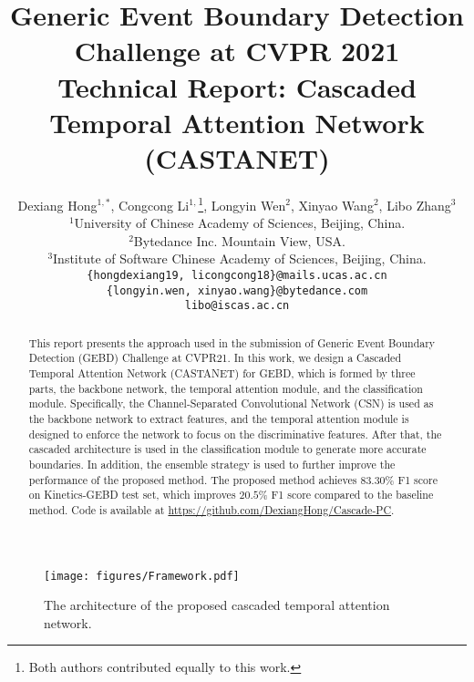\documentclass[final]{cvpr}
\begin{document}
\title{Generic Event Boundary Detection Challenge at CVPR 2021 \\
Technical Report: Cascaded Temporal Attention Network (CASTANET)
}

\author{Dexiang Hong$^{1,\ast}$, Congcong Li$^{1,}$\thanks{Both authors contributed equally to this work.}, Longyin Wen$^2$, Xinyao Wang$^2$, Libo Zhang$^3$ \\
$^1$University of Chinese Academy of Sciences, Beijing, China.\\
$^2$Bytedance Inc. Mountain View, USA.\\
$^3$Institute of Software Chinese Academy of Sciences, Beijing, China.\\
{\tt\small \{hongdexiang19, licongcong18\}@mails.ucas.ac.cn} \\
{\tt\small \{longyin.wen, xinyao.wang\}@bytedance.com} \\
{\tt\small libo@iscas.ac.cn}
}

\maketitle

\begin{abstract}
This report presents the approach used in the submission of Generic Event Boundary Detection (GEBD) Challenge at CVPR21. In this work, we design a Cascaded Temporal Attention Network (CASTANET) for GEBD, which is formed by three parts, the backbone network, the temporal attention module, and the classification module. Specifically, the Channel-Separated Convolutional Network (CSN) is used as the backbone network to extract features, and the temporal attention module is designed to enforce the network to focus on the discriminative features. After that, the cascaded architecture is used in the classification module to generate more accurate boundaries. In addition, the ensemble strategy is used to further improve the performance of the proposed method. The proposed method achieves $83.30\%$ F1 score on Kinetics-GEBD test set, which improves $20.5\%$ F1 score compared to the baseline method. Code is available at \href{https://github.com/DexiangHong/Cascade-PC}{https://github.com/DexiangHong/Cascade-PC}.
\end{abstract}


\begin{figure*}
\begin{center}
\texttt{[image: figures/Framework.pdf]}
\end{center}
  \caption{The architecture of the proposed cascaded temporal attention network.}
\label{fig:framework}
\end{figure*}
\end{document}
